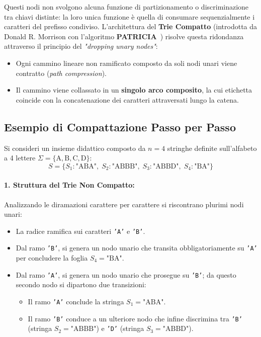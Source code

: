 Questi nodi non svolgono alcuna funzione di partizionamento o discriminazione tra chiavi distinte: la loro unica funzione \`e quella di consumare sequenzialmente i caratteri del prefisso condiviso.
L'architettura del \textbf{Trie Compatto} (introdotta da Donald R. Morrison con l'algoritmo \textbf{PATRICIA}~\cite{morrison1968}) risolve questa ridondanza attraverso il principio del \textit{"dropping unary nodes"}:
\begin{itemize}
  \item Ogni cammino lineare non ramificato composto da soli nodi unari viene contratto (\textit{path compression}).
  \item Il cammino viene collassato in un \textbf{singolo arco composito}, la cui etichetta coincide con la concatenazione dei caratteri attraversati lungo la catena.
\end{itemize}

\FloatBarrier
\subsection{Esempio di Compattazione Passo per Passo}
\label{subsec:esempio-compattazione}

Si consideri un insieme didattico composto da $n = 4$ stringhe definite sull'alfabeto a 4 lettere $\Sigma = \{\text{A}, \text{B}, \text{C}, \text{D}\}$:
\begin{equation}
  S = \{ S_1: \text{"ABA"}, \; S_2: \text{"ABBB"}, \; S_3: \text{"ABBD"}, \; S_4: \text{"BA"} \}
\end{equation}

\paragraph{1. Struttura del Trie Non Compatto:}
Analizzando le diramazioni carattere per carattere si riscontrano plurimi nodi unari:
\begin{itemize}
  \item La radice ramifica sui caratteri \texttt{'A'} e \texttt{'B'}.
  \item Dal ramo \texttt{'B'}, si genera un nodo unario che transita obbligatoriamente su \texttt{'A'} per concludere la foglia $S_4 = \text{"BA"}$.
  \item Dal ramo \texttt{'A'}, si genera un nodo unario che prosegue su \texttt{'B'}; da questo secondo nodo si dipartono due transizioni:
  \begin{itemize}
    \item Il ramo \texttt{'A'} conclude la stringa $S_1 = \text{"ABA"}$.
    \item Il ramo \texttt{'B'} conduce a un ulteriore nodo che infine discrimina tra \texttt{'B'} (stringa $S_2 = \text{"ABBB"}$) e \texttt{'D'} (stringa $S_3 = \text{"ABBD"}$).
  \end{itemize}
\end{itemize}

